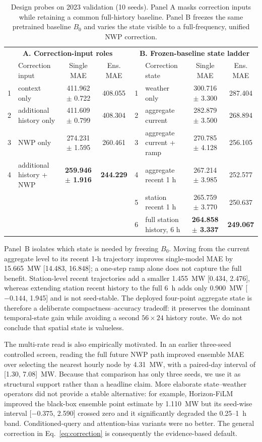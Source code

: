 \documentclass[conference]{IEEEtran}
\begin{document}
\begin{table}[t]
\caption{Design probes on 2023 validation (10 seeds). Panel A masks correction inputs while retaining a common full-history baseline. Panel B freezes the same pretrained baseline $B_0$ and varies the state visible to a full-frequency, unified NWP correction.}
\label{tab:design}
\centering
\small
\setlength{\tabcolsep}{6pt}
\begin{tabular}{clcc|clcc}
\toprule
\multicolumn{4}{c|}{\textbf{A. Correction-input roles}} & \multicolumn{4}{c}{\textbf{B. Frozen-baseline state ladder}} \\
 & Correction input & Single MAE & Ens. MAE & & Correction state & Single MAE & Ens. MAE \\
\midrule
1 & context only & 411.962 $\pm$ 0.722 & 408.055 & 1 & weather only & 300.716 $\pm$ 3.300 & 287.404 \\
2 & additional history only & 411.609 $\pm$ 0.799 & 408.304 & 2 & aggregate current & 282.879 $\pm$ 3.500 & 268.894 \\
3 & NWP only & 274.231 $\pm$ 1.595 & 260.461 & 3 & aggregate current + ramp & 270.785 $\pm$ 4.128 & 256.105 \\
4 & additional history + NWP & \textbf{259.946 $\pm$ 1.916} & \textbf{244.229} & 4 & aggregate recent 1 h & 267.214 $\pm$ 3.985 & 252.577 \\
 & & & & 5 & station recent 1 h & 265.759 $\pm$ 3.770 & 250.637 \\
 & & & & 6 & full station history, 6 h & \textbf{264.858 $\pm$ 3.337} & \textbf{249.067} \\
\bottomrule
\end{tabular}
\end{table}

Panel~B isolates which state is needed by freezing $B_0$. Moving from the current aggregate level to its recent 1-h trajectory improves single-model MAE by 15.665~MW [14.483, 16.848]; a one-step ramp alone does not capture the full benefit. Station-level recent trajectories add a smaller 1.455~MW [0.434, 2.476], whereas extending station recent history to the full 6~h adds only 0.900~MW [$-0.144$, 1.945] and is not seed-stable. The deployed four-point aggregate state is therefore a deliberate compactness--accuracy tradeoff: it preserves the dominant temporal-state gain while avoiding a second $56\times24$ history route. We do not conclude that spatial state is valueless.

The multi-rate read is also empirically motivated. In an earlier three-seed controlled screen, reading the full future NWP path improved ensemble MAE over selecting the nearest hourly node by 4.31~MW, with a paired-day interval of [1.30, 7.08]~MW. Because that comparison has only three seeds, we use it as structural support rather than a headline claim. More elaborate state--weather operators did not provide a stable alternative: for example, Horizon-FiLM improved the black-box ensemble point estimate by 1.110~MW but its seed-wise interval [$-0.375$, 2.590] crossed zero and it significantly degraded the 0.25--1~h band. Conditioned-query and attention-bias variants were no better. The general correction in Eq.~\eqref{eq:correction} is consequently the evidence-based default.
\end{document}
